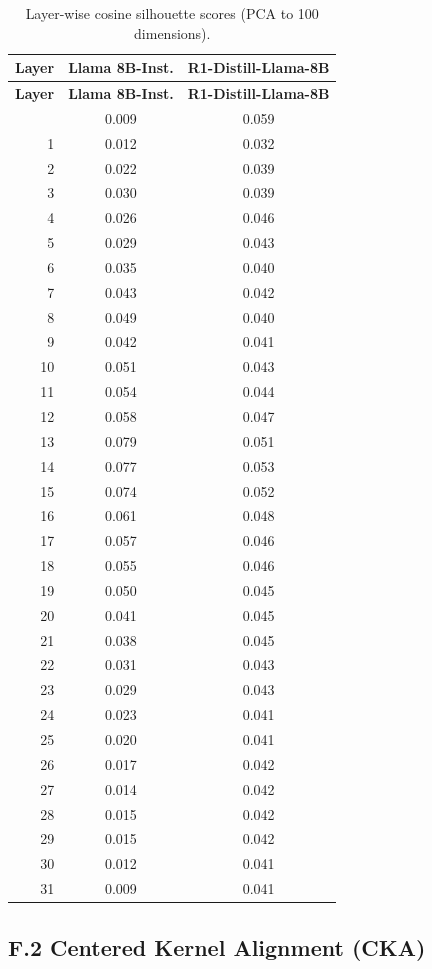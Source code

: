 \documentclass[accepted]{article}
\begin{document}
\begin{longtable}{rcc}
\caption{Layer-wise cosine silhouette scores (PCA to 100 dimensions).}
\label{tab:silhouette_layers} \\
\toprule
\textbf{Layer} & \textbf{Llama 8B-Inst.} & \textbf{R1-Distill-Llama-8B} \\
\midrule
\endfirsthead
\toprule
\textbf{Layer} & \textbf{Llama 8B-Inst.} & \textbf{R1-Distill-Llama-8B} \\
\midrule
\endhead
\bottomrule
\endfoot
 0 & 0.009 & 0.059 \\
 1 & 0.012 & 0.032 \\
 2 & 0.022 & 0.039 \\
 3 & 0.030 & 0.039 \\
 4 & 0.026 & 0.046 \\
 5 & 0.029 & 0.043 \\
 6 & 0.035 & 0.040 \\
 7 & 0.043 & 0.042 \\
 8 & 0.049 & 0.040 \\
 9 & 0.042 & 0.041 \\
10 & 0.051 & 0.043 \\
11 & 0.054 & 0.044 \\
12 & 0.058 & 0.047 \\
13 & 0.079 & 0.051 \\
14 & 0.077 & 0.053 \\
15 & 0.074 & 0.052 \\
16 & 0.061 & 0.048 \\
17 & 0.057 & 0.046 \\
18 & 0.055 & 0.046 \\
19 & 0.050 & 0.045 \\
20 & 0.041 & 0.045 \\
21 & 0.038 & 0.045 \\
22 & 0.031 & 0.043 \\
23 & 0.029 & 0.043 \\
24 & 0.023 & 0.041 \\
25 & 0.020 & 0.041 \\
26 & 0.017 & 0.042 \\
27 & 0.014 & 0.042 \\
28 & 0.015 & 0.042 \\
29 & 0.015 & 0.042 \\
30 & 0.012 & 0.041 \\
31 & 0.009 & 0.041 \\
\end{longtable}

\subsection*{F.2 Centered Kernel Alignment (CKA)}
\end{document}
